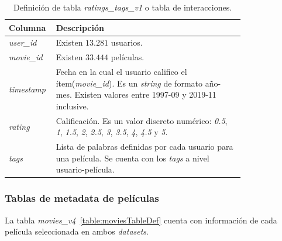\documentclass[11pt,a4paper,twoside]{thesis}
\begin{document}
\begin{table}[!htb]
	\centering
	\footnotesize
	\begin{tabular}{l | p{0.8\linewidth}}
		\hline
		Columna            & Descripción                                                                                                                                                                     \\
		\hline

		\textit{user\_id}  & Existen $13.281$ usuarios.                                                                                                                                                      \\
		\textit{movie\_id} & Existen $33.444$ películas.                                                                                                                                                     \\
		\textit{timestamp} & Fecha en la cual el usuario califico el ítem(\textit{movie\_id}). Es un \textit{string} de formato año-mes. Existen valores entre 1997-09 y 2019-11 inclusive.                  \\
		\textit{rating}    & Calificación. Es un valor discreto numérico: \textit{0.5}, \textit{1}, \textit{1.5}, \textit{2}, \textit{2.5}, \textit{3}, \textit{3.5}, \textit{4}, \textit{4.5} y \textit{5}. \\
		\textit{tags}      & Lista de palabras definidas por cada usuario para una película. Se cuenta con los \textit{tags} a nivel usuario-película.                                                       \\
		\hline
	\end{tabular}
	\caption{
		Definición de tabla \textit{ratings\_tags\_v1} o tabla de interacciones.
	}
	\label{table:interactionsTableDef}
\end{table}

\subsubsection*{Tablas de metadata de películas}

La tabla \textit{movies\_v4}~\ref{table:moviesTableDef} cuenta con información
de cada película seleccionada en ambos \textit{datasets}.
\end{document}
